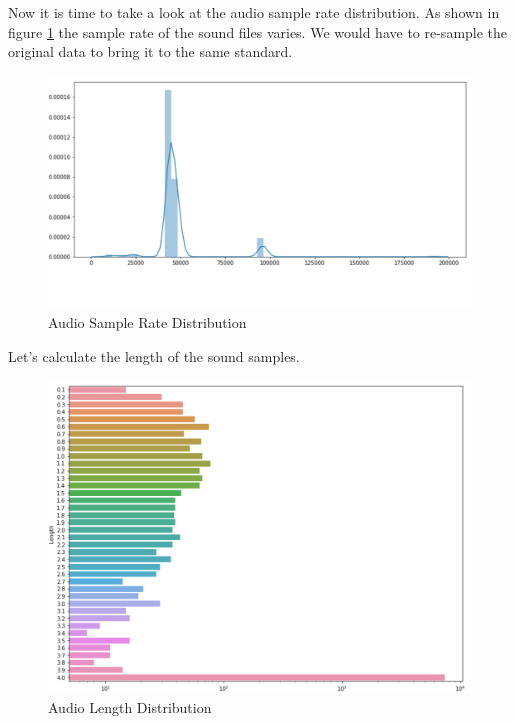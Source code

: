 Now it is time to take a look at the audio sample rate distribution. As
shown in figure \ref{fig:sampled} the sample rate of the sound files
varies. We would have to re-sample the original data to bring it to the
same standard.

\begin{Schunk}
\begin{figure}[H]

{\centering \includegraphics[width=1\linewidth]{../images/sampleRate} 

}

\caption[Audio Sample Rate Distribution]{Audio Sample Rate Distribution}\label{fig:sampled}
\end{figure}
\end{Schunk}

Let's calculate the length of the sound samples.

\begin{Schunk}
\begin{figure}[H]

{\centering \includegraphics[width=1\linewidth]{../images/durationOfSoundFiles} 

}

\caption[Audio Length Distribution]{Audio Length Distribution}\label{fig:lengthd}
\end{figure}
\end{Schunk}


